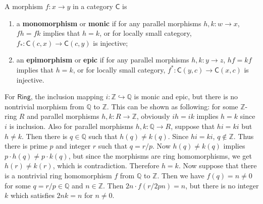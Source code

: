 \begin{defn} A morphism $f:x\rightarrow y$ in a category $\mathsf{C}$ is
\begin{enumerate}
\item a \textbf{monomorphism} or \textbf{monic} if for any parallel morphisms $h,k:w\rightarrow x$, $fh=fk$ implies that $h=k$, or for locally small category, $f_*:\mathsf{C}(c,x)\rightarrow \mathsf{C}(c,y)$ is injective;
\item {}an \textbf{epimorphism} or \textbf{epic} if for any parallel morphisms $h,k:y\rightarrow z$, $hf=kf$ implies that $h=k$, or for locally small category, $f^*:\mathsf{C}(y,c)\rightarrow \mathsf{C}(x,c)$ is injective.
\end{enumerate}
\end{defn}

\begin{exmp}
For $\mathsf{Ring}$, the inclusion mapping $i:\mathbb{Z}\hookrightarrow \mathbb{Q}$ is monic and epic, but there is no nontrivial morphism from $\mathbb{Q}$ to $\mathbb{Z}$. This can be shown as following: for some $\mathbb{Z}$-ring $R$ and parallel morphisms $h,k:R\rightarrow \mathbb{Z}$, obviously $ih=ik$ implies $h=k$ since $i$ is inclusion. Also for parallel morphisms $h,k:\mathbb{Q}\rightarrow R$, suppose that $hi=ki$ but $h\neq k$. Then there is $q\in \mathbb{Q}$ such that $h(q)\neq k(q)$. Since $hi=ki$, $q\notin \mathbb{Z}$. Thus there is prime $p$ and integer $r$ such that $q=r/p$. Now $h(q)\neq k(q)$ implies $p\cdot h(q)\neq p\cdot k(q)$, but since the morphisms are ring homomorphisms, we get $h(r)\neq k(r)$, which is contradiction. Therefore $h=k$. Now suppose that there is a nontrivial ring homomorphism $f$ from $\mathbb{Q}$ to $\mathbb{Z}$. Then we have $f(q)=n\neq 0$ for some $q=r/p\in \mathbb{Q}$ and $n\in \mathbb{Z}$. Then $2n\cdot f(r/2pn)=n$, but there is no integer $k$ which satisfies $2nk=n$ for $n\neq 0$.
\end{exmp}

